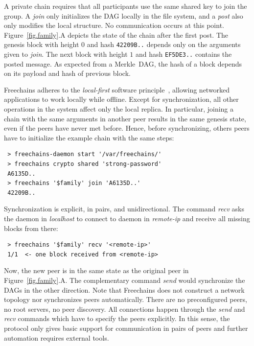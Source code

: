 \documentclass[10pt,journal,compsoc]{IEEEtran}
\newcommand{\FC}       {Freechains\xspace}
\begin{document}
A private chain requires that all participants use the same shared key to join
the group.
A \emph{join} only initializes the DAG locally in the file system, and a
\emph{post} also only modifies the local structure.
No communication occurs at this point.
Figure~\ref{fig.family}.A depicts the state of the chain after the first post.
The genesis block with height $0$ and hash \texttt{42209B..}
depends only on the arguments given to \emph{join}.
The next block with height $1$ and hash \texttt{EF5DE3..} contains the posted
message.
As expected from a Merkle~DAG, the hash of a block depends on its payload and
hash of previous block.

\FC adheres to the \emph{local-first} software principle~\cite{p2p.local},
allowing networked applications to work locally while offline.
Except for synchronization, all other operations in the system affect only the
local replica.
In particular, joining a chain with the same arguments in another peer results
in the same genesis state, even if the peers have never met before.
Hence, before synchronizing, others peers have to initialize the example chain
with the same steps:

{\footnotesize
\begin{verbatim}
 > freechains-daemon start '/var/freechains/'
 > freechains crypto shared 'strong-password'
 A6135D..
 > freechains '$family' join 'A6135D..'
 42209B..
\end{verbatim}
}

Synchronization is explicit, in pairs, and unidirectional.
The command \emph{recv} asks the daemon in \emph{localhost} to connect to
daemon in \emph{remote-ip} and receive all missing blocks from there:

{\footnotesize
\begin{verbatim}
 > freechains '$family' recv '<remote-ip>'
 1/1  <- one block received from <remote-ip>
\end{verbatim}
}

Now, the new peer is in the same state as the original peer in
Figure~\ref{fig.family}.A.
The complementary command \emph{send} would synchronize the DAGs in the other
direction.
Note that \FC does not construct a network topology nor synchronizes peers
automatically.
There are no preconfigured peers, no root servers, no peer discovery.
All connections happen through the \emph{send} and \emph{recv} commands which
have to specify the peers explicitly.
In this sense, the protocol only gives basic support for communication in pairs
of peers and further automation requires external tools.
\end{document}
